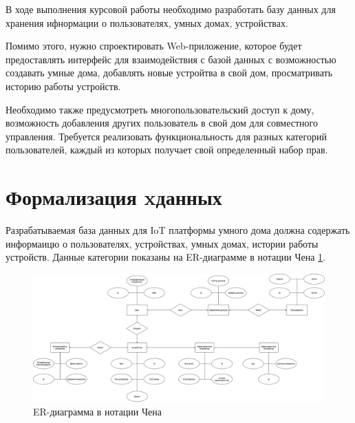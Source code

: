 В ходе выполнения курсовой работы необходимо разработать базу данных для хранения ифнормации 
о пользователях, умных домах, устройствах. 

Помимо этого, нужно спроектировать Web-приложение, 
которое будет предоставлять интерфейс для взаимодействия с базой данных с возможностью создавать умные дома, 
добавлять новые устройтва в свой дом, просматривать историю работы устройств.
    
Необходимо также предусмотреть многопользовательский доступ к дому, возможность добавления других пользователь 
в свой дом для совместного управления. Требуется реализовать функциональность для разных категорий пользователей, 
каждый из которых получает свой определенный набор прав.

\section{Формализация xданных}

Разрабатываемая база данных для IoT платформы умного дома должна содержать информаицю о пользователях, устройствах, умных домах,
истории работы устройств. Данные категории показаны на ER-диаграмме в нотации Чена \ref{img:er}.

\begin{figure}[h]
    \includegraphics[width=0.9\linewidth]{img/er.png}
    \caption{ER-диаграмма в нотации Чена}
    \label{img:er}
\end{figure}
\noindent
\clearpage

